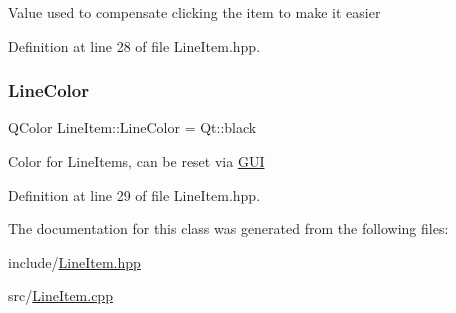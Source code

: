 Value used to compensate clicking the item to make it easier 

Definition at line 28 of file Line\+Item.\+hpp.

\mbox{\label{classLineItem_a290f246bf61be323ebd52f68bfe9ab4d}} 
\subsubsection{\texorpdfstring{Line\+Color}{LineColor}}
{\footnotesize\ttfamily Q\+Color Line\+Item\+::\+Line\+Color = Qt\+::black\hspace{0.3cm}{\ttfamily [static]}}

Color for Line\+Items, can be reset via \mbox{\hyperlink{classGUI}{G\+UI}} 

Definition at line 29 of file Line\+Item.\+hpp.



The documentation for this class was generated from the following files\+:\begin{DoxyCompactItemize}
\item 
include/\mbox{\hyperlink{LineItem_8hpp}{Line\+Item.\+hpp}}\item 
src/\mbox{\hyperlink{LineItem_8cpp}{Line\+Item.\+cpp}}\end{DoxyCompactItemize}
